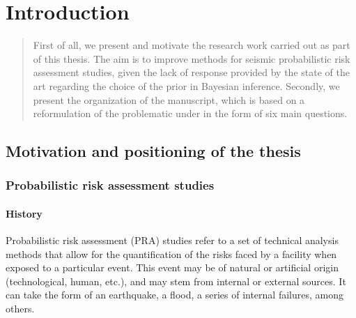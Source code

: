 

\newlength{\questlenght}
\newlength{\textminusquest}
\setlength{\textminusquest}{\textwidth}
\addtolength{\textminusquest}{-\questlenght}
\newcommand{\ques}[2]{%
\noindent\textbf{Question #1}\hfill
\begin{minipage}[t][25pt][t]{\textminusquest}
    #2
\end{minipage}    
}


\chapter{Introduction}\label{chap:intro-english}


\begin{abstract}
    First of all, we present and motivate the research work carried out as part of this thesis. The aim is to improve
methods for seismic probabilistic risk assessment studies, given the lack of response provided by the state of the art regarding the choice of the prior in Bayesian inference. Secondly, we present the organization of the manuscript, which is based on a reformulation of the problematic under
in the form of six main questions.
\end{abstract}

\minitoc


\section{Motivation and positioning of the thesis}






\subsection{Probabilistic risk assessment studies}


\subsubsection{History}


Probabilistic risk assessment (PRA) studies refer to a set of technical analysis methods that allow for the quantification of the risks faced by a facility when exposed to a particular event. This event may be of natural or artificial origin (technological, human, etc.), and may stem from internal or external sources. It can take the form of an earthquake, a flood, a series of internal failures, among others.

